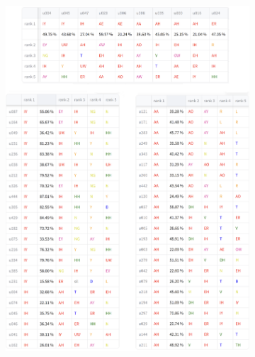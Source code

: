 {\begin{figure}
                         \label{fig:hub-u050-phnobserver--2}
        \end{figure}
    }

        {
        \newcommand{\tempwidth}[0]{0.8\linewidth}
        \begin{figure}
        \ContinuedFloat
        
             \centering
             \begin{subfigure}{\textwidth}
                 \centering
                 \includegraphics[width=\tempwidth]{chapters/vow_phn.png}

\end{subfigure}
\end{figure}}
